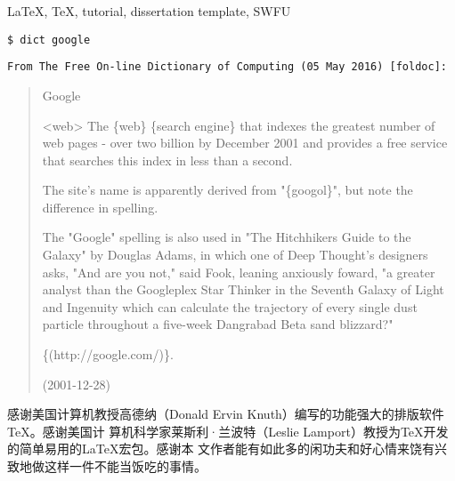 \documentclass{swfuthesis}
\begin{document}
\begin{EKeyword} %
  \LaTeX{}, \TeX{}, tutorial, dissertation template, SWFU
\end{EKeyword}

\tableofcontents %
\listoffigures %
\listoftables  %
\cleardoublepage %






\appendix

\makebib %

\begin{advisorInfo} %
\noindent{}\texttt{{\large \$ dict google}}
  \begin{singlespace}
    \noindent{}\texttt{From The Free On-line Dictionary of Computing (05 May 2016) [foldoc]:}

    \begin{quote}
      {\ttfamily \hspace{-2em}Google
    
        <web> The \{web\} \{search engine\} that indexes the greatest number of web pages
        - over two billion by December 2001 and provides a free service that searches this
        index in less than a second.
  
        The site's name is apparently derived from "\{googol\}", but note the difference
        in spelling.
  
        The "Google" spelling is also used in "The Hitchhikers Guide to the Galaxy" by
        Douglas Adams, in which one of Deep Thought's designers asks, "And are you not,"
        said Fook, leaning anxiously foward, "a greater analyst than the Googleplex Star
        Thinker in the Seventh Galaxy of Light and Ingenuity which can calculate the
        trajectory of every single dust particle throughout a five-week Dangrabad Beta
        sand blizzard?"
      
        \{(http://google.com/)\}.
      
        (2001-12-28) }
    \end{quote}
  \end{singlespace}
\end{advisorInfo}

\begin{acknowledgment} %
  感谢美国计算机教授高德纳（Donald Ervin Knuth）编写的功能强大的排版软件\TeX{}。感谢美国计
  算机科学家莱斯利·兰波特（Leslie Lamport）教授为\TeX{}开发的简单易用的\LaTeX{}宏包。感谢本
  文作者能有如此多的闲功夫和好心情来饶有兴致地做这样一件不能当饭吃的事情。
\end{acknowledgment}
\end{document}
